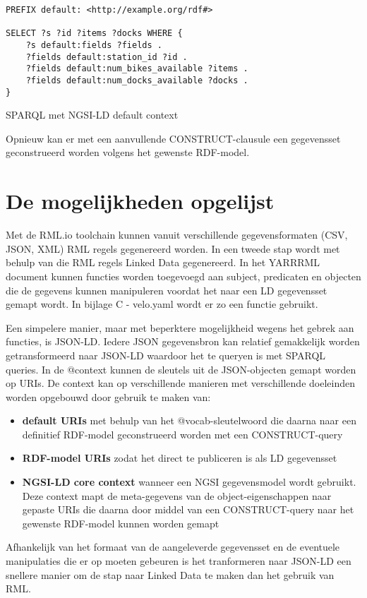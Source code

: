 \begin{code}
\centering
\begin{verbatim}
PREFIX default: <http://example.org/rdf#>

SELECT ?s ?id ?items ?docks WHERE {
    ?s default:fields ?fields .
    ?fields default:station_id ?id .
    ?fields default:num_bikes_available ?items .
    ?fields default:num_docks_available ?docks .
}
\end{verbatim}
\caption{SPARQL met NGSI-LD default context}
\label{ngsild-default-context}
\end{code}

Opnieuw kan er met een aanvullende CONSTRUCT-clausule een gegevensset geconstrueerd worden volgens het gewenste RDF-model.

\section{De mogelijkheden opgelijst}
Met de RML.io toolchain kunnen vanuit verschillende gegevensformaten (CSV, JSON, XML) RML regels gegenereerd worden. In een tweede stap wordt met behulp van die RML regels Linked Data gegenereerd. In het YARRRML document kunnen functies worden toegevoegd aan subject, predicaten en objecten die de gegevens kunnen manipuleren voordat het naar een LD gegevensset gemapt wordt. In bijlage C - velo.yaml wordt er zo een functie gebruikt.

Een simpelere manier, maar met beperktere mogelijkheid wegens het gebrek aan functies, is JSON-LD. Iedere JSON gegevensbron kan relatief gemakkelijk worden getransformeerd naar JSON-LD waardoor het te queryen is met SPARQL queries. In de @context kunnen de sleutels uit de JSON-objecten gemapt worden op URIs. De context kan op verschillende manieren met verschillende doeleinden worden opgebouwd door gebruik te maken van:

\begin{itemize}
    \item \textbf{default URIs} met behulp van het @vocab-sleutelwoord die daarna naar een definitief RDF-model geconstrueerd worden met een CONSTRUCT-query
    \item \textbf{RDF-model URIs} zodat het direct te publiceren is als LD gegevensset
    \item \textbf{NGSI-LD core context} wanneer een NGSI gegevensmodel wordt gebruikt. Deze context mapt de meta-gegevens van de object-eigenschappen naar gepaste URIs die daarna door middel van een CONSTRUCT-query naar het gewenste RDF-model kunnen worden gemapt
\end{itemize}

Afhankelijk van het formaat van de aangeleverde gegevensset en de eventuele manipulaties die er op moeten gebeuren is het tranformeren naar JSON-LD een snellere manier om de stap naar Linked Data te maken dan het gebruik van RML.